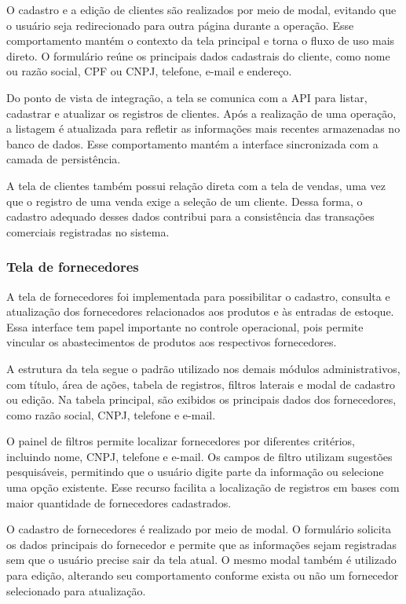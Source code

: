 O cadastro e a edição de clientes são realizados por meio de modal, evitando que o usuário seja redirecionado para outra página durante a operação. Esse comportamento mantém o contexto da tela principal e torna o fluxo de uso mais direto. O formulário reúne os principais dados cadastrais do cliente, como nome ou razão social, CPF ou CNPJ, telefone, e-mail e endereço.

Do ponto de vista de integração, a tela se comunica com a API para listar, cadastrar e atualizar os registros de clientes. Após a realização de uma operação, a listagem é atualizada para refletir as informações mais recentes armazenadas no banco de dados. Esse comportamento mantém a interface sincronizada com a camada de persistência.

A tela de clientes também possui relação direta com a tela de vendas, uma vez que o registro de uma venda exige a seleção de um cliente. Dessa forma, o cadastro adequado desses dados contribui para a consistência das transações comerciais registradas no sistema.

\subsubsection{Tela de fornecedores}

A tela de fornecedores foi implementada para possibilitar o cadastro, consulta e atualização dos fornecedores relacionados aos produtos e às entradas de estoque. Essa interface tem papel importante no controle operacional, pois permite vincular os abastecimentos de produtos aos respectivos fornecedores.

A estrutura da tela segue o padrão utilizado nos demais módulos administrativos, com título, área de ações, tabela de registros, filtros laterais e modal de cadastro ou edição. Na tabela principal, são exibidos os principais dados dos fornecedores, como razão social, CNPJ, telefone e e-mail.

O painel de filtros permite localizar fornecedores por diferentes critérios, incluindo nome, CNPJ, telefone e e-mail. Os campos de filtro utilizam sugestões pesquisáveis, permitindo que o usuário digite parte da informação ou selecione uma opção existente. Esse recurso facilita a localização de registros em bases com maior quantidade de fornecedores cadastrados.

O cadastro de fornecedores é realizado por meio de modal. O formulário solicita os dados principais do fornecedor e permite que as informações sejam registradas sem que o usuário precise sair da tela atual. O mesmo modal também é utilizado para edição, alterando seu comportamento conforme exista ou não um fornecedor selecionado para atualização.

